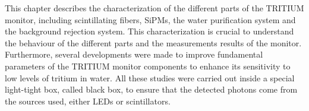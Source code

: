 This chapter describes the characterization of the different parts of the TRITIUM monitor, including scintillating fibers, SiPMs, the water purification system and the background rejection system. This characterization is crucial to understand the behaviour of the different parts and the measurements results of the monitor. Furthermore, several developments were made  to improve fundamental parameters of the TRITIUM monitor components to enhance its sensitivity to low levels of tritium in water. All these studies were carried out inside a special light-tight box, called black box, to ensure that the detected photons come from the sources used, either LEDs or scintillators. %